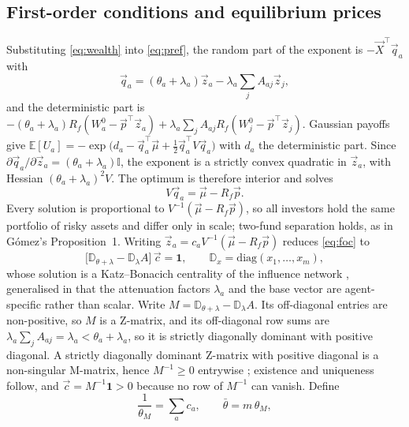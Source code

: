 \documentclass[12pt]{article}
\theoremstyle{definition}
\theoremstyle{remark}
\newcommand{\E}{\mathbb{E}}
\newcommand{\bth}{\bar\theta}
\newcommand{\D}{\mathbb{D}}
\begin{document}
\subsection{First-order conditions and equilibrium prices}

Substituting \eqref{eq:wealth} into \eqref{eq:pref}, the random part of the
exponent is $-\vec X^{\top}\vec q_a$ with
%
\begin{equation}
\vec q_a=(\theta_a+\lambda_a)\vec z_a-\lambda_a\sum_jA_{aj}\vec z_j ,
\label{eq:qa}
\end{equation}
%
and the deterministic part is
$-(\theta_a+\lambda_a)R_f(W_a^0-\vec p^{\top}\vec z_a)
+\lambda_a\sum_jA_{aj}R_f(W_j^0-\vec p^{\top}\vec z_j)$. Gaussian payoffs give
$\E[U_a]=-\exp\big(d_a-\vec q_a^{\top}\vec\mu+\tfrac12\vec q_a^{\top}V\vec q_a\big)$
with $d_a$ the deterministic part. Since
$\partial\vec q_a/\partial\vec z_a=(\theta_a+\lambda_a)\mathbb{I}$, the exponent
is a strictly convex quadratic in $\vec z_a$, with Hessian
$(\theta_a+\lambda_a)^{2}V$. The optimum is therefore interior and solves
%
\begin{equation}
V\vec q_a=\vec\mu-R_f\vec p .
\label{eq:foc}
\end{equation}
%
Every solution is proportional to $V^{-1}(\vec\mu-R_f\vec p)$, so all investors
hold the same portfolio of risky assets and differ only in scale; two-fund
separation holds, as in Gómez's Proposition~1. Writing
$\vec z_a=c_aV^{-1}(\vec\mu-R_f\vec p)$ reduces \eqref{eq:foc} to
%
\begin{equation}
\big[\D_{\theta+\lambda}-\D_{\lambda}A\big]\,\vec c=\mathbf 1,
\qquad \D_x=\mathrm{diag}(x_1,\dots,x_m),
\label{eq:system}
\end{equation}
%
whose solution is a Katz--Bonacich centrality of the influence network
\cite{ballester}, generalised in that the attenuation factors $\lambda_a$ and
the base vector are agent-specific rather than scalar. Write
$M=\D_{\theta+\lambda}-\D_{\lambda}A$. Its off-diagonal entries are
non-positive, so $M$ is a Z-matrix, and its off-diagonal row sums are
$\lambda_a\sum_jA_{aj}=\lambda_a<\theta_a+\lambda_a$, so it is strictly
diagonally dominant with positive diagonal. A strictly diagonally dominant
Z-matrix with positive diagonal is a non-singular M-matrix, hence $M^{-1}\geq0$
entrywise \cite{bermanplemmons}; existence and uniqueness follow, and
$\vec c=M^{-1}\mathbf 1>0$ because no row of $M^{-1}$ can vanish. Define
%
\begin{equation}
\frac{1}{\theta_M}=\sum_ac_a,
\qquad \bth=m\,\theta_M ,
\label{eq:thm}
\end{equation}
\end{document}
